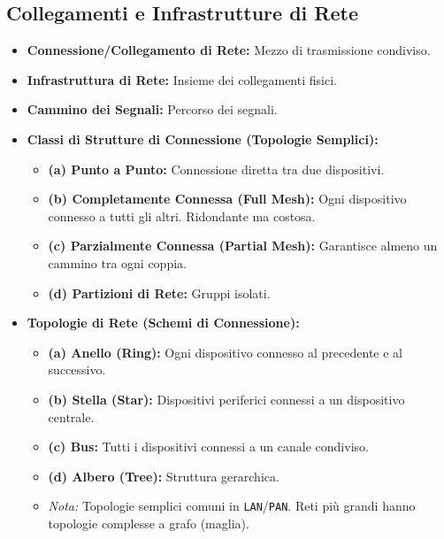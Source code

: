 \subsection{Collegamenti e Infrastrutture di Rete}
\begin{itemize}
    \item \textbf{Connessione/Collegamento di Rete:} Mezzo di trasmissione condiviso.
    \item \textbf{Infrastruttura di Rete:} Insieme dei collegamenti fisici.
    \item \textbf{Cammino dei Segnali:} Percorso dei segnali.
    \item \textbf{Classi di Strutture di Connessione (Topologie Semplici):}
    \begin{itemize}
        \item \textbf{(a) Punto a Punto:} Connessione diretta tra due dispositivi.
        \item \textbf{(b) Completamente Connessa (Full Mesh):} Ogni dispositivo connesso a tutti gli altri. Ridondante ma costosa.
        \item \textbf{(c) Parzialmente Connessa (Partial Mesh):} Garantisce almeno un cammino tra ogni coppia.
        \item \textbf{(d) Partizioni di Rete:} Gruppi isolati.
    \end{itemize}
    \item \textbf{Topologie di Rete (Schemi di Connessione):}
    \begin{itemize}
        \item \textbf{(a) Anello (Ring):} Ogni dispositivo connesso al precedente e al successivo.
        \item \textbf{(b) Stella (Star):} Dispositivi periferici connessi a un dispositivo centrale.
        \item \textbf{(c) Bus:} Tutti i dispositivi connessi a un canale condiviso.
        \item \textbf{(d) Albero (Tree):} Struttura gerarchica.
        \item \textit{Nota:} Topologie semplici comuni in \texttt{LAN}/\texttt{PAN}. Reti più grandi hanno topologie complesse a grafo (maglia).
    \end{itemize}
\end{itemize}

